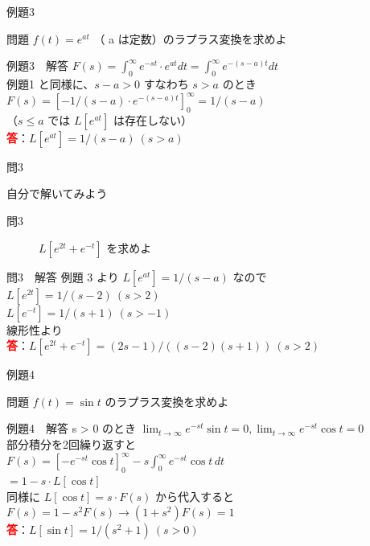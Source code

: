 \documentclass[professionalfonts]{beamer}
\begin{document}
\begin{frame}{例題3}
  \begin{exampleblock}{問題}
    $f(t) = e^{at}$ （ a は定数）のラプラス変換を求めよ\\[2pt]
  \end{exampleblock}
\end{frame}

\begin{frame}{例題3　解答}
  $F(s) = \int_{0}^\infty e^{-st} \cdot e^{at} dt = \int_{0}^\infty e^{-(s-a)t} dt$\\[4pt]
  例題1 と同様に、$s-a > 0$ すなわち $s > a$ のとき\\[4pt]
  $F(s) = [-1/(s-a) \cdot e^{-(s-a)t}]_{0}^\infty = 1/(s-a)$\\[4pt]
  （$s \leq a$ では $L[e^{at}]$ は存在しない）
  \\[8pt]\textcolor{red}{\textbf{答}}：$L[e^{at}] = 1/(s-a) \ (s > a)$
\end{frame}

\begin{frame}{問3}
  \begin{exampleblock}{自分で解いてみよう}
  \begin{description}
    \item[問3] $L[e^{2t} + e^{-t}]$ を求めよ
  \end{description}
  \end{exampleblock}
\end{frame}

\begin{frame}{問3　解答}
  例題 3 より $L[e^{at}] = 1/(s-a)$ なので\\[4pt]
  $L[e^{2t}] = 1/(s-2) \ (s > 2)$\\[4pt]
  $L[e^{-t}] = 1/(s+1) \ (s > -1)$\\[4pt]
  線形性より
  \\[8pt]\textcolor{red}{\textbf{答}}：$L[e^{2t} + e^{-t}] = (2s-1)/((s-2)(s+1)) \ (s > 2)$
\end{frame}

\begin{frame}{例題4}
  \begin{exampleblock}{問題}
    $f(t) = \sin t$ のラプラス変換を求めよ\\[2pt]
  \end{exampleblock}
\end{frame}

\begin{frame}{例題4　解答}
  s > 0 のとき $\lim_{t \to \infty} e^{-st}\sin t = 0, \lim_{t \to \infty} e^{-st}\cos t = 0$\\[4pt]
  部分積分を2回繰り返すと\\[4pt]
  $F(s) = [-e^{-st}\cos t]_{0}^\infty - s\int_{0}^\infty e^{-st}\cos t\, dt$\\[4pt]
  $= 1 - s\cdot L[\cos t]$\\[4pt]
  同様に $L[\cos t] = s\cdot F(s)$ から代入すると\\[4pt]
  $F(s) = 1 - s^{2}F(s)   \to   (1 + s^{2})F(s) = 1$
  \\[8pt]\textcolor{red}{\textbf{答}}：$L[\sin t] = 1/(s^{2}+1) \ (s > 0)$
\end{frame}
\end{document}
